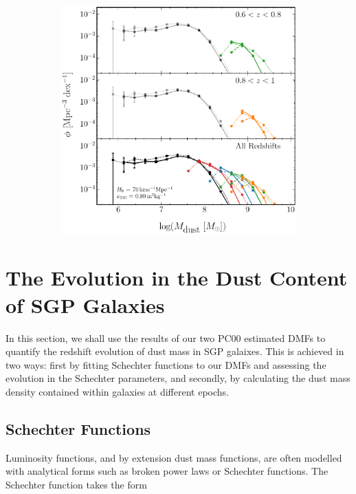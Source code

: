 \begin{figure}
    \captionsetup[subfigure]{labelformat=empty}
    \begin{subfigure}{\textwidth}
    \includegraphics[width=\columnwidth]{Figures/dmf_methods_part2.pdf}
    \end{subfigure}
\end{figure}

\section{The Evolution in the Dust Content of SGP Galaxies}

In this section, we shall use the results of our two PC00 estimated DMFs to quantify the redshift evolution of dust mass in SGP galaixes. This is achieved in two ways: first by fitting Schechter functions to our DMFs and assessing the evolution in the Schechter parameters, and secondly, by calculating the dust mass density contained within galaxies at different epochs.

\subsection{Schechter Functions}
\label{sec:schechter_functions}

Luminosity functions, and by extension dust mass functions, are often modelled with analytical forms such as broken power laws or Schechter functions. The Schechter function takes the form

